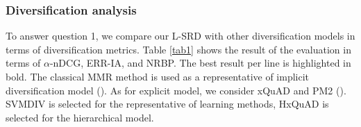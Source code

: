 \documentclass[review]{elsarticle}
\begin{document}
%

\subsubsection{Diversification analysis}\label{diver_com}
To answer question 1, we compare our L-SRD with other diversification models in terms of diversification metrics. Table \ref{tab1} shows the result of the evaluation in terms of $\alpha$-nDCG, ERR-IA, and NRBP. The best result per line is highlighted in bold. The classical MMR method is used as a representative of implicit diversification model (\cite{carbonell1998use}). As for explicit model, we consider xQuAD and PM2 (\cite{santos2010exploiting,dang2012diversity}). SVMDIV is selected for the representative of learning methods, HxQuAD is selected for the hierarchical model.
\end{document}
